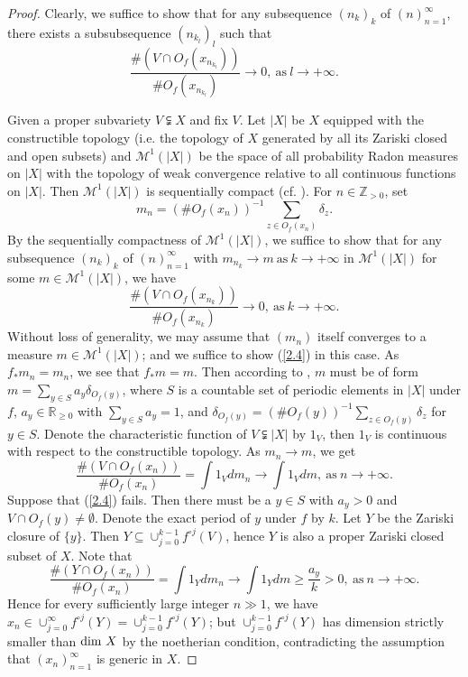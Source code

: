 \documentclass[12pt]{amsart}
\theoremstyle{plain}
\theoremstyle{remark}
\theoremstyle{definition}
\def\Z{\mathbb Z}
\def\R{\mathbb R}
\begin{document}
\begin{proof}
	Clearly, we suffice to show that for any subsequence $(n_k)_k$ of $(n)_{n=1}^\infty$, there exists a subsubsequence $(n_{k_l})_l$ such that $$\frac{\#(V\cap O_f(x_{n_{k_l}}))}{\# O_f(x_{n_{k_l}})}\to0,\ \text{as}\ l\to+\infty.$$ 
	\par Given a proper subvariety $V\subsetneqq X$ and fix $V$. Let $\lvert X\rvert$ be $X$ equipped with the constructible topology (i.e. the topology of $X$ generated by all its Zariski closed and open subsets) and $\mathcal{M}^1(\lvert X\rvert)$ be the space of all probability Radon measures on $\lvert X\rvert$ with the topology of weak convergence relative to all continuous functions on $\lvert X\rvert$. Then $\mathcal{M}^1(\lvert X\rvert)$ is sequentially compact (cf. \cite[Corollary 1.14]{Xie2023}). For $n\in\Z_{>0}$, set $$m_n=(\# O_f(x_n))^{-1}\sum_{z\in O_f(x_n)}\delta_z.$$By the sequentially compactness of $\mathcal{M}^1(\lvert X\rvert)$, we suffice to show that for any subsequence $(n_k)_k$ of $(n)_{n=1}^\infty$ with $m_{n_k}\to m\ \text{as}\ k\to+\infty$ in $\mathcal{M}^1(\lvert X\rvert)$ for some $m\in\mathcal{M}^1(\lvert X\rvert)$, we have $$\frac{\#(V\cap O_f(x_{n_k}))}{\# O_f(x_{n_k})}\to0,\ \text{as}\ k\to+\infty.$$ Without loss of generality, we may assume that $(m_n)$ itself converges to a measure $m\in\mathcal{M}^1(\lvert X\rvert)$; and we suffice to show (\ref{2.4}) in this case. As $f_*m_n=m_n$, we see that $f_*m=m$. Then according to \cite[Lemma 5.3]{Xie2023}, $m$ must be of form $m=\sum_{y\in S}a_y\delta_{O_f(y)}$, where $S$ is a countable set of periodic elements in $\lvert X\rvert$ under $f$, $a_y\in\R_{\geq0}$ with $\sum_{y\in S}a_y=1$, and $\delta_{O_f(y)}=(\#O_f(y))^{-1}\sum_{z\in O_f(y)}\delta_z$ for $y\in S$. Denote the characteristic function of $V\subsetneqq \lvert X\rvert$ by $1_V$, then $1_V$ is continuous with respect to the constructible topology. As $m_n \to m$, we get$$\frac{\#(V\cap O_f(x_{n}))}{\# O_f(x_{n})}=\int 1_V dm_n\to\int 1_V dm,\ \text{as}\ n\to+\infty.$$ Suppose that (\ref{2.4}) fails. Then there must be a $y\in S$ with $a_y>0$ and $V\cap O_f(y)\neq\emptyset$. Denote the exact period of $y$ under $f$ by $k$. Let $Y$ be the Zariski closure of $\{y\}$. Then $Y\subseteq\cup_{j=0}^{k-1}f^{\circ j}(V)$, hence $Y$ is also a proper Zariski closed subset of $X$. Note that $$\frac{\#(Y\cap O_f(x_{n}))}{\# O_f(x_{n})}=\int 1_Y dm_n\to\int 1_Y dm\geq\frac{a_y}{k}>0,\ \text{as}\ n\to+\infty.$$Hence for every sufficiently large integer $n\gg1$, we have $x_n\in\cup_{j=0}^\infty f^{\circ j}(Y)=\cup_{j=0}^{k-1} f^{\circ j}(Y)$; but $\cup_{j=0}^{k-1} f^{\circ j}(Y)$ has dimension strictly smaller than ${\rm dim}\ X$ by the noetherian condition, contradicting the assumption that $(x_n)_{n=1}^\infty$ is generic in $X$.
\end{proof}
\end{document}
